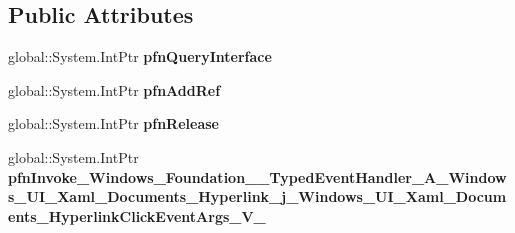 \subsection*{Public Attributes}
\begin{DoxyCompactItemize}
\item 
\mbox{\label{struct_windows_1_1_foundation_1_1_typed_event_handler___a___windows___u_i___xaml___documents___hfd9a29b8a1965140a2921dbd50b4ecfb_aa1250acfd538cb59c9b6348e6b3f14b1}} 
global\+::\+System.\+Int\+Ptr {\bfseries pfn\+Query\+Interface}
\item 
\mbox{\label{struct_windows_1_1_foundation_1_1_typed_event_handler___a___windows___u_i___xaml___documents___hfd9a29b8a1965140a2921dbd50b4ecfb_a7de55422ff487fbe1b35dc6f12c55f57}} 
global\+::\+System.\+Int\+Ptr {\bfseries pfn\+Add\+Ref}
\item 
\mbox{\label{struct_windows_1_1_foundation_1_1_typed_event_handler___a___windows___u_i___xaml___documents___hfd9a29b8a1965140a2921dbd50b4ecfb_a6b8dc898b7a6ad6cf90951f39d58be47}} 
global\+::\+System.\+Int\+Ptr {\bfseries pfn\+Release}
\item 
\mbox{\label{struct_windows_1_1_foundation_1_1_typed_event_handler___a___windows___u_i___xaml___documents___hfd9a29b8a1965140a2921dbd50b4ecfb_a96ea5d045f387358903076e9ee0fab7e}} 
global\+::\+System.\+Int\+Ptr {\bfseries pfn\+Invoke\+\_\+\+Windows\+\_\+\+Foundation\+\_\+\+\_\+\+Typed\+Event\+Handler\+\_\+\+A\+\_\+\+Windows\+\_\+\+U\+I\+\_\+\+Xaml\+\_\+\+Documents\+\_\+\+Hyperlink\+\_\+j\+\_\+\+Windows\+\_\+\+U\+I\+\_\+\+Xaml\+\_\+\+Documents\+\_\+\+Hyperlink\+Click\+Event\+Args\+\_\+\+V\+\_\+}
\end{DoxyCompactItemize}
